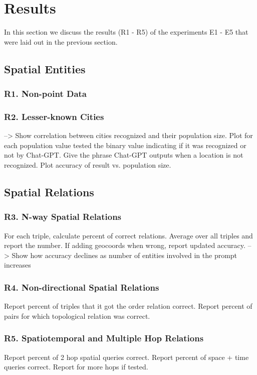 \section{Results}
\label{section:results}

In this section we discuss the results (R1 - R5) of the experiments E1 - E5 that were laid out in the previous section.

\subsection{Spatial Entities} %

\subsubsection{R1. Non-point Data}


\subsubsection{R2. Lesser-known Cities}
--> Show correlation between cities recognized and their population size. Plot for each population value tested the binary value indicating if it was recognized or not by Chat-GPT.
Give the phrase Chat-GPT outputs when a location is not recognized.
Plot accuracy of result vs. population size.



\subsection{Spatial Relations} %

\subsubsection{R3. N-way Spatial Relations}
For each triple, calculate percent of correct relations. Average over all triples and report the number.
If adding geocoords when wrong, report updated accuracy.
--> Show how accuracy declines as number of entities involved in the prompt increases


\subsubsection{R4. Non-directional Spatial Relations}
Report percent of triples that it got the order relation correct.
Report percent of pairs for which topological relation was correct.


\subsubsection{R5. Spatiotemporal and Multiple Hop Relations}
Report percent of 2 hop spatial queries correct.
Report percent of space + time queries correct.
Report for more hops if tested.